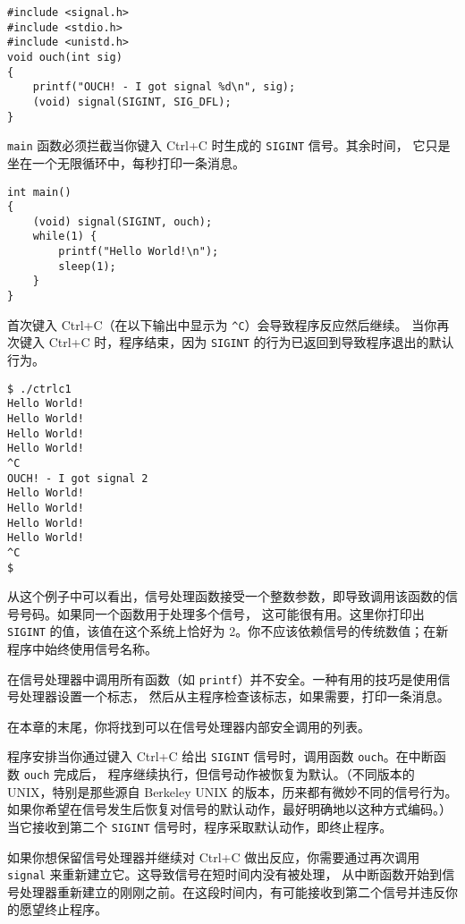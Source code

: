 \documentclass{ctexart}
\begin{document}
\begin{verbatim}  
#include <signal.h>  
#include <stdio.h>  
#include <unistd.h>  
void ouch(int sig)  
{  
    printf("OUCH! - I got signal %d\n", sig);  
    (void) signal(SIGINT, SIG_DFL);  
}  
\end{verbatim}  
  
\texttt{main} 函数必须拦截当你键入 Ctrl+C 时生成的 \texttt{SIGINT} 信号。其余时间，
它只是坐在一个无限循环中，每秒打印一条消息。  
  
\begin{verbatim}  
int main()  
{  
    (void) signal(SIGINT, ouch);  
    while(1) {  
        printf("Hello World!\n");  
        sleep(1);  
    }  
}  
\end{verbatim}  
  
首次键入 Ctrl+C（在以下输出中显示为 \verb|^C|）会导致程序反应然后继续。
当你再次键入 Ctrl+C 时，程序结束，因为 \texttt{SIGINT} 的行为已返回到导致程序退出的默认行为。  
  
\begin{verbatim}  
$ ./ctrlc1  
Hello World!  
Hello World!  
Hello World!  
Hello World!  
^C  
OUCH! - I got signal 2  
Hello World!  
Hello World!  
Hello World!  
Hello World!  
^C  
$  
\end{verbatim}  
  
从这个例子中可以看出，信号处理函数接受一个整数参数，即导致调用该函数的信号号码。如果同一个函数用于处理多个信号，
这可能很有用。这里你打印出 \texttt{SIGINT} 的值，该值在这个系统上恰好为 2。你不应该依赖信号的传统数值；在新程序中始终使用信号名称。  
  
在信号处理器中调用所有函数（如 \texttt{printf}）并不安全。一种有用的技巧是使用信号处理器设置一个标志，
然后从主程序检查该标志，如果需要，打印一条消息。  
  
在本章的末尾，你将找到可以在信号处理器内部安全调用的列表。  

程序安排当你通过键入 Ctrl+C 给出 \texttt{SIGINT} 信号时，调用函数 \texttt{ouch}。在中断函数 \texttt{ouch} 完成后，
程序继续执行，但信号动作被恢复为默认。（不同版本的 UNIX，特别是那些源自 Berkeley UNIX 的版本，历来都有微妙不同的信号行为。
如果你希望在信号发生后恢复对信号的默认动作，最好明确地以这种方式编码。）当它接收到第二个 \texttt{SIGINT} 信号时，程序采取默认动作，即终止程序。  
  
如果你想保留信号处理器并继续对 Ctrl+C 做出反应，你需要通过再次调用 \texttt{signal} 来重新建立它。这导致信号在短时间内没有被处理，
从中断函数开始到信号处理器重新建立的刚刚之前。在这段时间内，有可能接收到第二个信号并违反你的愿望终止程序。  
  
\end{document}
